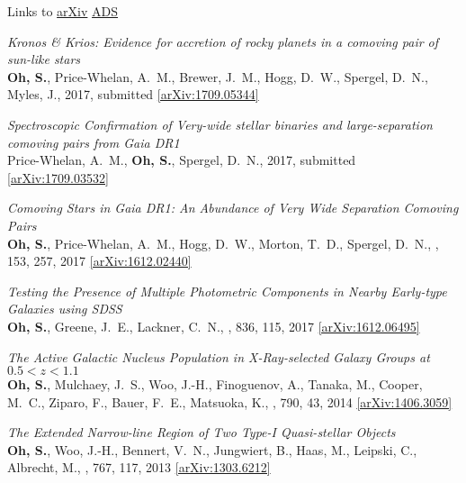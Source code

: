 \documentclass[11pt,letterpaper]{article}
\newcommand*\arxiv[1]{\href{https://arxiv.org/abs/#1}{[arXiv:#1]}}
\begin{document}
\noindent
Links to \href{https://arxiv.org/find/all/1/all:+AND+semyeong+oh/0/1/0/all/0/1}{arXiv}
\href{http://adsabs.harvard.edu/cgi-bin/nph-abs_connect?library&libname=Semyeong+Oh&libid=4e8800e01f}{ADS}

\begin{etaremune}
\item {\it Kronos \& Krios: Evidence for accretion of rocky planets in a comoving pair of sun-like stars}\\
    {{\bf {Oh}, S.}, {Price-Whelan}, A.~M., {Brewer}, J.~M., {Hogg}, D.~W.,
      {Spergel}, D.~N., {Myles}, J.},
    2017, submitted
    \arxiv{1709.05344}

  \item {\it Spectroscopic Confirmation of Very-wide stellar binaries and
      large-separation comoving pairs from Gaia DR1}\\
    {{Price-Whelan}, A.~M., {\bf {Oh}, S.}, {Spergel}, D.~N.}, 2017, submitted
    \arxiv{1709.03532}

  \item {\it Comoving Stars in Gaia DR1: An Abundance of Very Wide Separation Comoving Pairs}\\
    {{\bf {Oh}, S.}, {Price-Whelan}, A.~M., {Hogg}, D.~W.,
      {Morton}, T.~D., {Spergel}, D.~N.}, \aj, 153, 257, 2017
    \arxiv{1612.02440}

  \item {\it Testing the Presence of Multiple Photometric Components in Nearby Early-type Galaxies using SDSS}\\
    {{\bf {Oh}, S.}, {Greene}, J.~E., {Lackner}, C.~N.}, \apj, 836, 115, 2017
		\arxiv{1612.06495}

  \item {\it The Active Galactic Nucleus Population in X-Ray-selected Galaxy Groups at $0.5 < z < 1.1$}\\
    {{\bf {Oh}, S.}, {Mulchaey}, J.~S., {Woo}, J.-H., {Finoguenov}, A.,
      {Tanaka}, M., {Cooper}, M.~C., {Ziparo}, F., {Bauer}, F.~E., {Matsuoka}, K.},
    \apj, 790, 43, 2014
		\arxiv{1406.3059}

	\item {\it The Extended Narrow-line Region of Two Type-I Quasi-stellar Objects}\\
    {{\bf {Oh}, S.}, {Woo}, J.-H., {Bennert}, V.~N., {Jungwiert}, B., {Haas},
      M., {Leipski}, C., {Albrecht}, M.},
    \apj, 767, 117, 2013 \arxiv{1303.6212}
\end{etaremune}

% 
\end{document}
